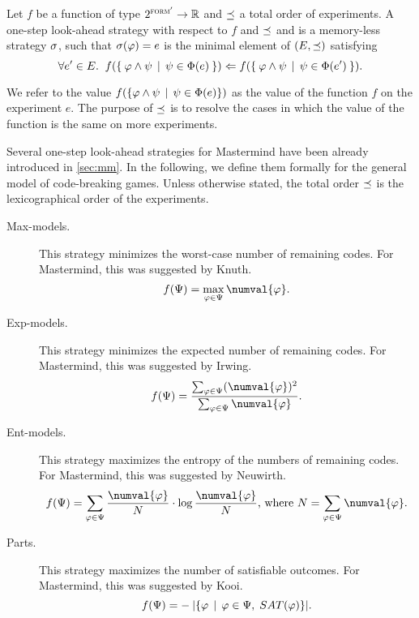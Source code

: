 \newcommand{\formset}{\Psi}
\begin{definition}\label{def:oslas}
Let $f$ be a function of type $2^{{\textsc{form}'}} -> \mathbb{R}$ and
  $\preceq$ a total order of experiments.
A one-step look-ahead strategy with respect to $f$ and $\preceq$ and is
  a memory-less strategy $\sigma$, such that
  $\sigma(\varphi) = e$ is the minimal element of $(E,\preceq)$ satisfying
\[
\forall e'\in E. \;\; f(\{\:\varphi \wedge \psi \:\:|\:\: \psi\in\Phi(e) \:\}) <=
  f(\{\: \varphi \wedge \psi \:\:|\:\: \psi\in\Phi(e') \:\}).
\]
\end{definition}

We refer to the value $f(\{\varphi \wedge \psi \:\:|\:\: \psi\in\Phi(e)\})$
  as the value of the function $f$ on the experiment $e$.
The purpose of $\preceq$ is to resolve the cases in which
  the value of the function is the same on more experiments.

Several one-step look-ahead strategies for Mastermind
  have been already introduced in \autoref{sec:mm}.
In the following, we define them formally for the general model of code-breaking games.
Unless otherwise stated, the total order $\preceq$ is
  the lexicographical order of the experiments.

\begin{description}
\item[Max-models.]
This strategy minimizes the worst-case number of remaining codes.
For Mastermind, this was suggested by Knuth\cite{mm-knuth}.
\[
f(\formset) = \max_{\form\in\formset} \numval{\form}.
\]

\item[Exp-models.]
This strategy minimizes the expected number of remaining codes.
  For Mastermind, this was suggested by Irwing\cite{mm-expnum}.
\[
f(\formset) = \frac{\sum_{\form\in\formset}(\numval{\form})^2}{\sum_{\form\in\formset} \numval{\form}}.
\]

\item[Ent-models.]
This strategy maximizes the entropy of the numbers of remaining codes.
For Mastermind, this was suggested by Neuwirth\cite{mm-entropy}.
\[
f(\formset) = \sum_{\form\in\formset} \frac{\numval{\form}}{N} \cdot \log \frac{\numval{\form}}{N}
  \textrm{, where } N = \sum_{\form\in\formset}\numval{\form}.
\]

\item[Parts.]
This strategy maximizes the number of satisfiable outcomes.
For Mastermind, this was suggested by Kooi\cite{mm-mostparts}.
\[
f(\formset) = - \:|\{ \form \| \form\in\formset, \;\SAT{\form} \}|.
\]
\end{description}

